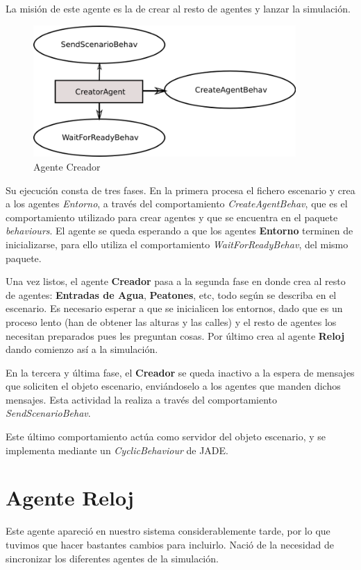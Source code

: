 La misión de este agente es la de crear al resto de agentes y lanzar la
simulación.

\begin{figure}[H]
 \centering
 \includegraphics[width=100mm]{figuras/cap5/ag_creator.png}
 \caption{Agente Creador}
\end{figure}

Su ejecución consta de tres fases. En la primera procesa el fichero escenario y
crea a los agentes {\em Entorno}, a través del comportamiento {\em
CreateAgentBehav}, que es el comportamiento utilizado para crear agentes y que
se encuentra en el paquete {\em behaviours}. El agente se queda esperando a que
los agentes {\bf Entorno} terminen de inicializarse, para ello utiliza el
comportamiento {\em WaitForReadyBehav}, del mismo paquete.

Una vez listos, el agente {\bf Creador} pasa a la segunda fase en donde crea al
resto de agentes: {\bf Entradas de Agua}, {\bf Peatones}, etc, todo según se
describa en el escenario. Es necesario esperar a que se inicialicen los
entornos, dado que es un proceso lento (han de obtener las alturas y las
calles) y el resto de agentes los necesitan preparados pues les preguntan cosas.
Por último crea al agente {\bf Reloj} dando comienzo así a la simulación.

En la tercera y última fase, el {\bf Creador} se queda inactivo a la espera de
mensajes que soliciten el objeto escenario, enviándoselo a los agentes que
manden dichos mensajes. Esta actividad la realiza a través del comportamiento
{\em SendScenarioBehav}.

Este último comportamiento actúa como servidor del objeto escenario, y se
implementa mediante un {\em CyclicBehaviour} de JADE.

\section{Agente Reloj}

Este agente apareció en nuestro sistema considerablemente tarde, por lo que
tuvimos que hacer bastantes cambios para incluirlo. Nació de la necesidad de
sincronizar los diferentes agentes de la simulación.


